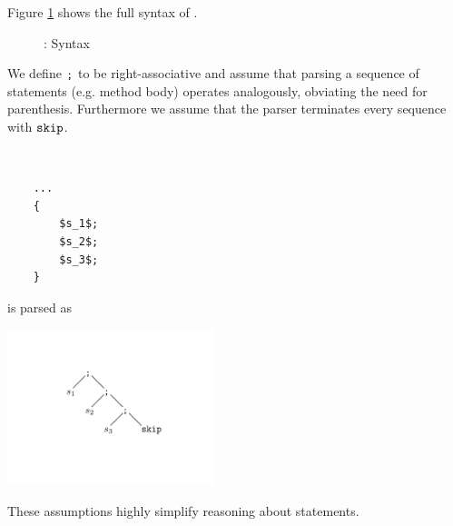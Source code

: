 Figure \ref{fig:idf-syntax} shows the full syntax of \svlidf.
\begin{figure}[h]
    
    \caption{\svlidf: Syntax}
    \label{fig:idf-syntax}
\end{figure}

We define $\textup{\texttt{;}}$ to be right-associative and assume that parsing a sequence of statements (e.g. method body) operates analogously, obviating the need for parenthesis.
Furthermore we assume that the parser terminates every sequence with $\textup{\texttt{skip}}$.
\begin{example}~
    \begin{lstlisting}
    ...
    {
        $s_1$;
        $s_2$;
        $s_3$;
    }
    \end{lstlisting}
    is parsed as
    
    \includegraphics[trim={3cm 3cm 3cm 3cm}, clip, width=6cm]{graphics/rightAssocSkip}
\end{example}
These assumptions highly simplify reasoning about statements.
